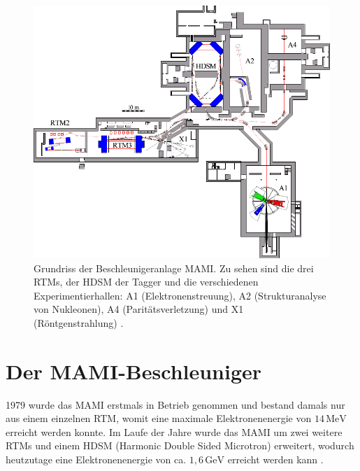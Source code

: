 \documentclass[a4paper,11pt,oneside,final,german,openbib,pdftex]{scrbook}
\begin{document}
{\begin{figure}[h!]
	\includegraphics{grundriss}
	\caption[Grundriss der MAMI-Anlage]{Grundriss der Beschleunigeranlage MAMI. Zu sehen sind die drei RTMs, der HDSM der Tagger und die verschiedenen Experimentierhallen: A1 (Elektronenstreuung), A2 (Strukturanalyse von Nukleonen), A4 (Parit\"atsverletzung) und X1 (R\"ontgenstrahlung) \cite{KPh07}.}
	\label{fig.grundriss_anlage}
\end{figure}


\section{Der MAMI-Beschleuniger}
1979 wurde das MAMI erstmals in Betrieb genommen und bestand damals nur aus einem einzelnen RTM, womit eine maximale Elektronenenergie von $14\, \text{MeV}$ erreicht werden konnte. 
Im Laufe der Jahre wurde das MAMI um zwei weitere RTMs und einem HDSM (Harmonic Double Sided Microtron) erweitert, wodurch heutzutage eine Elektronenenergie von ca. $1,6\, \text{GeV}$ erreicht werden kann \cite{KPh11G}. 
\newline


}
\end{document}
